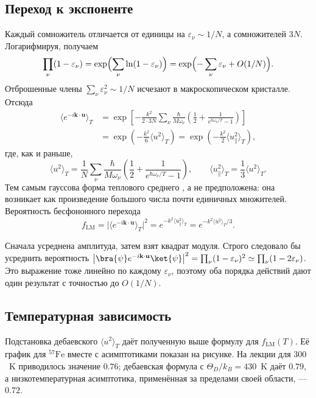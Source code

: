 \documentclass[../final.tex]{subfiles}
\begin{document}
\subsection{Переход к экспоненте}
Каждый сомножитель отличается от единицы на $\varepsilon_\nu\sim1/N$,
а сомножителей $3N$. Логарифмируя, получаем
\begin{equation*}
 \prod_\nu(1-\varepsilon_\nu)
 =\exp\Bigl(\sum_\nu\ln(1-\varepsilon_\nu)\Bigr)
 =\exp\Bigl(-\sum_\nu\varepsilon_\nu+O(1/N)\Bigr).
\end{equation*}
Отброшенные члены $\sum_\nu\varepsilon_\nu^2\sim1/N$ исчезают в макроскопическом
кристалле. Отсюда
\begin{align*}
 \langle e^{-i\mathbf k\cdot\mathbf u}\rangle_T
 &=\exp\left[-\frac{k^2}{2\cdot3N}\sum_\nu\frac{\hbar}{M\omega_\nu}
 \left(\frac12+\frac1{e^{\hbar\omega_\nu/T}-1}\right)\right]\\
 &=\exp\left(-\frac{k^2}{6}\langle u^2\rangle_T\right)
 =\exp\left(-\frac{k^2}{2}\langle u_\parallel^2\rangle_T\right),
\end{align*}
где, как и раньше,
\begin{equation*}
 \langle u^2\rangle_T=\frac1N\sum_\nu\frac{\hbar}{M\omega_\nu}
 \left(\frac12+\frac1{e^{\hbar\omega_\nu/T}-1}\right),\qquad
 \langle u_\parallel^2\rangle_T=\frac13\langle u^2\rangle_T.
\end{equation*}
Тем самым гауссова форма теплового среднего ,
а не предположена: она возникает как произведение большого числа
почти единичных множителей. Вероятность бесфононного перехода
\begin{equation*}
 f_{\mathrm{LM}}=\bigl|\langle e^{-i\mathbf k\cdot\mathbf u}\rangle_T\bigr|^2
 =e^{-k^2\langle u_\parallel^2\rangle_T}
 =e^{-k^2\langle u^2\rangle_T/3}.
\end{equation*}

\remark
Сначала усреднена амплитуда, затем взят квадрат модуля.
Строго следовало бы усреднить вероятность
$\bigl|\bra{\psi}e^{-i\mathbf k\cdot\mathbf u}\ket{\psi}\bigr|^2
=\prod_\nu(1-\varepsilon_\nu)^2\simeq\prod_\nu(1-2\varepsilon_\nu)$.
Это выражение тоже линейно по каждому $\varepsilon_\nu$, поэтому оба порядка
действий дают один результат с точностью до $O(1/N)$.

\clearpage
\subsection{Температурная зависимость}
Подстановка дебаевского $\langle u^2\rangle_T$ даёт полученную выше формулу
для $f_{\mathrm{LM}}(T)$. Её график для $^{57}\mathrm{Fe}$ вместе с асимптотиками
показан на рисунке. На лекции для $300$~K приводилось значение $0.76$;
дебаевская формула с $\Theta_D/k_B=430$~K даёт $0.79$, а низкотемпературная
асимптотика, применённая за пределами своей области, --- $0.72$.
\end{document}

